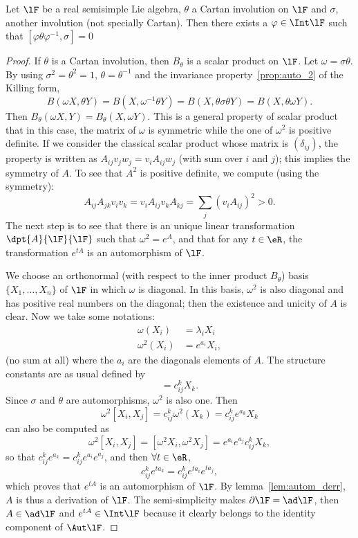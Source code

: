 \begin{theorem}
	Let $\lF$ be a real semisimple Lie algebra, $\theta$ a Cartan involution on $\lF$ and $\sigma$, another involution (not specially Cartan). Then there exists a $\varphi\in\Int\lF$ such that $[\varphi\theta\varphi^{-1},\sigma]=0$
	\label{tho:sigma_theta_un}
\end{theorem}

\begin{proof}
	If $\theta$ is a Cartan involution, then $B_{\theta}$ is a scalar product on $\lF$. Let $\omega=\sigma\theta$. By using $\sigma^2=\theta^2=1$, $\theta=\theta^{-1}$ and the invariance property~\ref{prop:auto_2} of the Killing form,
	\begin{equation}
		B(\omega X,\theta Y)=B(X,\omega^{-1}\theta Y)
		=B(X,\theta\sigma\theta Y)
		=B(X,\theta\omega Y).
	\end{equation}
	Then $B_{\theta}(\omega X,Y)=B_{\theta}(X,\omega Y)$. This is a general property of scalar product that in this case, the matrix of $\omega$ is symmetric while the one of $\omega^2$ is positive definite. If we consider the classical scalar product whose matrix is $(\delta_{ij})$, the property is written as $A_{ij}v_jw_j=v_iA_{ij}w_j$ (with sum over $i$ and $j$); this implies the symmetry of $A$. To see that $A^2$ is positive definite, we compute (using the symmetry):
	\[
		A_{ij}A_{jk}v_iv_k=v_iA_{ij}v_kA_{kj}=\sum_j(v_iA_{ij})^2>0.
	\]
	The next step is to see that there is an unique linear transformation $\dpt{A}{\lF}{\lF}$ such that $\omega^2=e^A$, and that for any $t\in\eR$, the transformation $e^{tA}$ is an automorphism of $\lF$.

	We choose an orthonormal (with respect to the inner product $B_{\theta}$) basis $\{X_1,\ldots,X_n\}$  of $\lF$ in which $\omega$ is diagonal. In this basis, $\omega^2$ is also diagonal and has positive real numbers on the diagonal; then the existence and unicity of $A$ is clear. Now we take some notations:
	\begin{subequations}
		\begin{align}
			\omega(X_i)   & =\lambda_iX_i \\
			\omega^2(X_i) & =e^{a_i}X_i,
		\end{align}
	\end{subequations}
	(no sum at all) where the $a_i$ are the diagonals elements of $A$. The structure constants are as usual defined by
	\begin{equation}
		[X_i,X_j]=c_{ij}^kX_k.
	\end{equation}
	Since $\sigma$ and $\theta$ are automorphisms, $\omega^2$ is also one. Then
	\[
		\omega^2[X_i,X_j]=c_{ij}^k\omega^2(X_k)=c_{ij}^ke^{a_k}X_k
	\]
	can also be computed as
	\[
		\omega^2[X_i,X_j]=[\omega^2X_i,\omega^2X_j]=e^{a_i}e^{a_j}c_{ij}^kX_k,
	\]
	so that $c_{ij}^ke^{a_k}=c_{ij}^ke^{a_i}e^{a_j}$, and then $\forall t\in\eR$,
	\[
		c_{ij}^ke^{ta_k}=c_{ij}^ke^{ta_i}e^{ta_j},
	\]
	which proves that $e^{tA}$ is an automorphism of $\lF$. By lemma~\ref{lem:autom_derr}, $A$ is thus a derivation of $\lF$. The semi-simplicity makes $\partial\lF=\ad\lF$, then $A\in\ad\lF$ and $e^{tA}\in\Int\lF$ because it clearly belongs to the identity component of $\Aut\lF$.


\end{proof}
